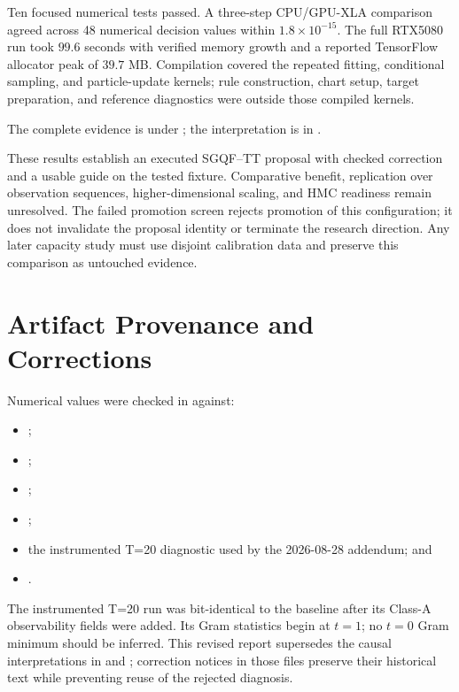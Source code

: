 \documentclass[11pt]{article}
\begin{document}
Ten focused numerical tests passed. A three-step CPU/GPU-XLA comparison
agreed across 48 numerical decision values within $1.8\times10^{-15}$.
The full RTX5080 run took $99.6$ seconds with verified memory growth and a
reported TensorFlow allocator peak of $39.7$ MB. Compilation covered the
repeated fitting, conditional sampling, and particle-update kernels; rule
construction, chart setup, target preparation, and reference diagnostics
were outside those compiled kernels.

\begingroup
\def\UrlBreaks{\do\/\do\_\do\-}
The complete evidence is under
;
the interpretation is in
.
\par\endgroup
These results establish an executed SGQF--TT proposal with checked correction
and a usable guide on the tested fixture. Comparative benefit, replication
over observation sequences, higher-dimensional scaling, and HMC readiness
remain unresolved. The failed promotion screen rejects promotion of this
configuration; it does not invalidate the proposal identity or terminate
the research direction. Any later capacity study must use disjoint
calibration data and preserve this comparison as untouched evidence.

\appendix
\section{Artifact Provenance and Corrections}

Numerical values were checked in
 against:
\begin{itemize}
\item {};
\item {};
\item {};
\item {};
\item the instrumented T=20 diagnostic used by the 2026-08-28 addendum; and
\item {}.
\end{itemize}

The instrumented T=20 run was bit-identical to the baseline after its Class-A
observability fields were added. Its Gram statistics begin at $t=1$; no $t=0$
Gram minimum should be inferred. This revised report supersedes the causal
interpretations in  and
; correction notices in
those files preserve their historical text while preventing reuse of the
rejected diagnosis.
\end{document}
